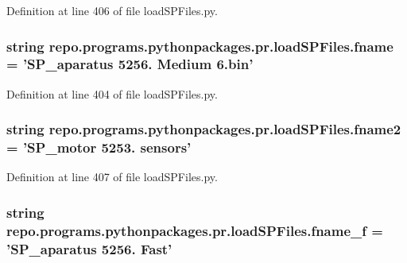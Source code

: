 Definition at line 406 of file load\-S\-P\-Files.\-py.

\hypertarget{namespacerepo_1_1programs_1_1pythonpackages_1_1pr_1_1loadSPFiles_acfe87f91d2373c3c41bf59a6024b8a94}{
\subsubsection[{fname}]{\setlength{\rightskip}{0pt plus 5cm}string repo.\-programs.\-pythonpackages.\-pr.\-load\-S\-P\-Files.\-fname = 'S\-P\-\_\-aparatus 5256. Medium 6.bin'}}\label{namespacerepo_1_1programs_1_1pythonpackages_1_1pr_1_1loadSPFiles_acfe87f91d2373c3c41bf59a6024b8a94}


Definition at line 404 of file load\-S\-P\-Files.\-py.

\hypertarget{namespacerepo_1_1programs_1_1pythonpackages_1_1pr_1_1loadSPFiles_a9058f0ead0c926f493bb7f6ae52a49ea}{
\subsubsection[{fname2}]{\setlength{\rightskip}{0pt plus 5cm}string repo.\-programs.\-pythonpackages.\-pr.\-load\-S\-P\-Files.\-fname2 = 'S\-P\-\_\-motor 5253. sensors'}}\label{namespacerepo_1_1programs_1_1pythonpackages_1_1pr_1_1loadSPFiles_a9058f0ead0c926f493bb7f6ae52a49ea}


Definition at line 407 of file load\-S\-P\-Files.\-py.

\hypertarget{namespacerepo_1_1programs_1_1pythonpackages_1_1pr_1_1loadSPFiles_af897386d87d4d72567fb337653aa3105}{
\subsubsection[{fname\-\_\-f}]{\setlength{\rightskip}{0pt plus 5cm}string repo.\-programs.\-pythonpackages.\-pr.\-load\-S\-P\-Files.\-fname\-\_\-f = 'S\-P\-\_\-aparatus 5256. Fast'}}\label{namespacerepo_1_1programs_1_1pythonpackages_1_1pr_1_1loadSPFiles_af897386d87d4d72567fb337653aa3105}


